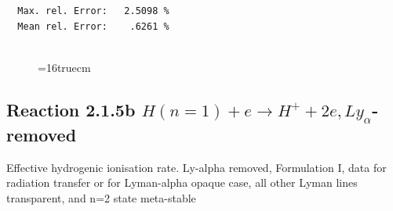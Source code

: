 \documentclass[12pt,dvipdfmx]{article}
\begin{document}
\begin{small}
\begin{verbatim}
  Max. rel. Error:   2.5098 %
  Mean rel. Error:    .6261 %


\end{verbatim}\end{small}
\begin{figure} \label{2.1.5a}
\epsfxsize=16truecm
\end{figure}
\newpage

\subsection{
Reaction 2.1.5b  $H(n=1) + e \rightarrow H^+ + 2e, Ly_\alpha$-removed}


   Effective hydrogenic ionisation rate.
   Ly-alpha removed, Formulation I, data for radiation transfer
   or for Lyman-alpha opaque case, all other Lyman lines transparent,
   and n=2 state meta-stable
\end{document}
